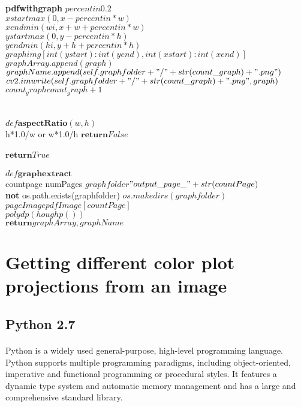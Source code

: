 \documentclass[a4paper,10pt]{scrreprt}
\begin{document}
\begin{pseudocode}{\textbf{pdfwithgraph}}{ }
\BEGIN 
$percentin$\GETS$0.2$\\
$xstart$\GETS$max(0,x-percentin*w)$\\
$xend$\GETS$min(wi,x+w+percentin*w)$\\
$ystart$\GETS$max(0,y-percentin*h)$\\
$yend$\GETS$min(hi,y+h+percentin*h)$\\
$graph$\GETS$img[int(ystart):int(yend),int(xstart):int(xend)]$\\
$graphArray.append(graph)$\\
$graphName.append(self.graphfolder+"/"+str(count\_graph)+".png")$\\
$cv2.imwrite(self.graphfolder+"/"+str(count\_graph)+".png",graph)$\\
$count_graph$\GETS$count_graph + 1$\\
\END 
\END
\END
\END\\
\\
$def \textbf{aspectRatio}(w,h)$\\
\IF h*1.0/w or w*1.0/h \THEN
\BEGIN
$\textbf{return} False$\\
\END \\
$\textbf{return} True$\\
\\
$def \textbf{graphextract}$\\
\FOR countpage \TO numPages\DO
\BEGIN
$graphfolder$\GETS$"output\_page\_"+str(countPage)$\\
\IF \textbf{not} os.path.exists(graphfolder) \THEN
\BEGIN 
$os.makedirs(graphfolder)$\\
$pageImage$\GETS$pdfImage[countPage]$\\
$polydp(houghp())$\\
\END 
$\textbf{return} graphArray,graphName$\\
\END 
\end{pseudocode}


\section{Getting different color plot projections from an image}
\subsection{Python 2.7}
\paragraph{}
Python is a widely used general-purpose, high-level programming language.
Python supports multiple programming paradigms, including object-oriented, imperative and functional programming or procedural styles. It features a dynamic type system and automatic memory management and has a large and comprehensive standard library.
\end{document}
